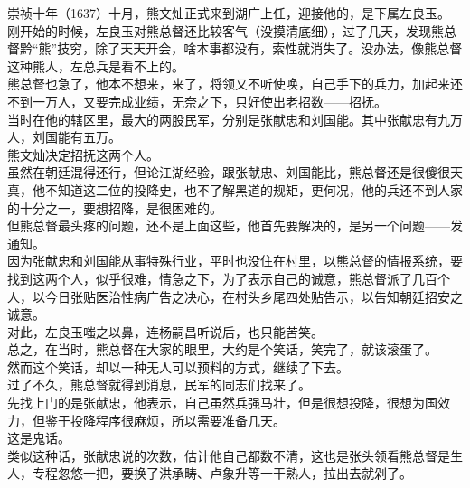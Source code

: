 \begin{multicols}{\theparacolNo}
崇祯十年（1637）十月，熊文灿正式来到湖广上任，迎接他的，是下属左良玉。\\

刚开始的时候，左良玉对熊总督还比较客气（没摸清底细），过了几天，发现熊总督黔“熊”技穷，除了天天开会，啥本事都没有，索性就消失了。没办法，像熊总督这种熊人，左总兵是看不上的。\\

熊总督也急了，他本不想来，来了，将领又不听使唤，自己手下的兵力，加起来还不到一万人，又要完成业绩，无奈之下，只好使出老招数——招抚。\\

当时在他的辖区里，最大的两股民军，分别是张献忠和刘国能。其中张献忠有九万人，刘国能有五万。\\

熊文灿决定招抚这两个人。\\

虽然在朝廷混得还行，但论江湖经验，跟张献忠、刘国能比，熊总督还是很傻很天真，他不知道这二位的投降史，也不了解黑道的规矩，更何况，他的兵还不到人家的十分之一，要想招降，是很困难的。\\

但熊总督最头疼的问题，还不是上面这些，他首先要解决的，是另一个问题——发通知。\\

因为张献忠和刘国能从事特殊行业，平时也没住在村里，以熊总督的情报系统，要找到这两个人，似乎很难，情急之下，为了表示自己的诚意，熊总督派了几百个人，以今日张贴医治性病广告之决心，在村头乡尾四处贴告示，以告知朝廷招安之诚意。\\

对此，左良玉嗤之以鼻，连杨嗣昌听说后，也只能苦笑。\\

总之，在当时，熊总督在大家的眼里，大约是个笑话，笑完了，就该滚蛋了。\\

然而这个笑话，却以一种无人可以预料的方式，继续了下去。\\

过了不久，熊总督就得到消息，民军的同志们找来了。\\

先找上门的是张献忠，他表示，自己虽然兵强马壮，但是很想投降，很想为国效力，但鉴于投降程序很麻烦，所以需要准备几天。\\

这是鬼话。\\

类似这种话，张献忠说的次数，估计他自己都数不清，这也是张头领看熊总督是生人，专程忽悠一把，要换了洪承畴、卢象升等一干熟人，拉出去就剁了。\\


\end{multicols}
